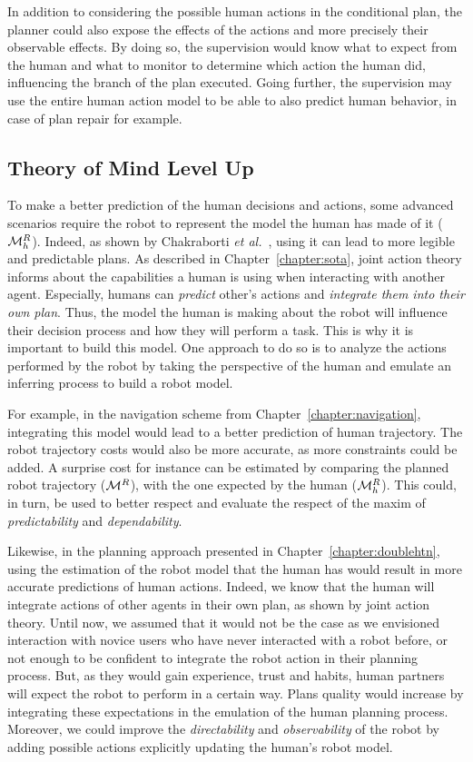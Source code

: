 \documentclass[a4paper,11pt,twoside]{StyleThese}
\begin{document}
In addition to considering the possible human actions in the conditional plan, the planner could also expose the effects of the actions and more precisely their observable effects. By doing so, the supervision would know what to expect from the human and what to monitor to determine which action the human did, influencing the branch of the plan executed. Going further, the supervision may use the entire human action model to be able to also predict human behavior, in case of plan repair for example.

\subsection*{Theory of Mind Level Up}
To make a better prediction of the human decisions and actions, some advanced scenarios require the robot to represent the model the human has made of it ($\mathcal{M}^R_h$). Indeed, as shown by Chakraborti \textit{et al.}~\cite{chakraborti2017plan}, using it can lead to more legible and predictable plans. As described in Chapter~\ref{chapter:sota}, joint action theory informs about the capabilities a human is using when interacting with another agent. Especially, humans can \textit{predict} other's actions and \textit{integrate them into their own plan}. Thus, the model the human is making about the robot will influence their decision process and how they will perform a task. This is why it is important to build this model. One approach to do so is to analyze the actions performed by the robot by taking the perspective of the human and emulate an inferring process to build a robot model.

For example, in the navigation scheme from Chapter~\ref{chapter:navigation}, integrating this model would lead to a better prediction of human trajectory. The robot trajectory costs would also be more accurate, as more constraints could be added. A surprise cost for instance can be estimated by comparing the planned robot trajectory ($\mathcal{M}^R$), with the one expected by the human ($\mathcal{M}^R_h$). This could, in turn, be used to better respect and evaluate the respect of the maxim of \textit{predictability} and \textit{dependability}.

Likewise, in the planning approach presented in Chapter~\ref{chapter:doublehtn}, using the estimation of the robot model that the human has would result in more accurate predictions of human actions. Indeed, we know that the human will integrate actions of other agents in their own plan, as shown by joint action theory. Until now, we assumed that it would not be the case as we envisioned interaction with novice users who have never interacted with a robot before, or not enough to be confident to integrate the robot action in their planning process. But, as they would gain experience, trust and habits, human partners will expect the robot to perform in a certain way. Plans quality would increase by integrating these expectations in the emulation of the human planning process. Moreover, we could improve the \textit{directability} and \textit{observability} of the robot by adding possible actions explicitly updating the human's robot model.


\ifdefined{}
\else


\end{document}
